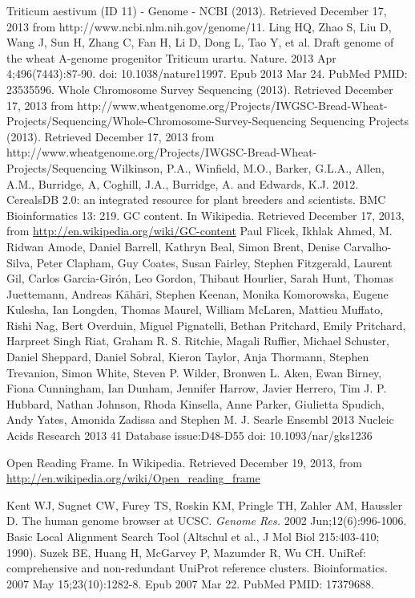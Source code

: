 \documentclass[10.9pt]{article} %
\begin{document}
%
%
\newpage
\begin{thebibliography}{99}
{\small
{}
Triticum aestivum (ID 11) - Genome - NCBI (2013). Retrieved December 17, 2013 from http://www.ncbi.nlm.nih.gov/genome/11.
Ling HQ, Zhao S, Liu D, Wang J, Sun H, Zhang C, Fan H, Li D, Dong L, Tao Y, et al. Draft genome of the wheat A-genome progenitor Triticum
urartu. Nature. 2013 Apr 4;496(7443):87-90. doi: 10.1038/nature11997. Epub 2013 Mar 24. PubMed PMID: 23535596. 
Whole Chromosome Survey Sequencing (2013). Retrieved December 17, 2013 from http://www.wheatgenome.org/Projects/IWGSC-Bread-Wheat-
Projects/Sequencing/Whole-Chromosome-Survey-Sequencing
Sequencing Projects (2013). Retrieved December 17, 2013 from http://www.wheatgenome.org/Projects/IWGSC-Bread-Wheat-Projects/Sequencing
Wilkinson, P.A., Winfield, M.O., Barker, G.L.A., Allen, A.M., Burridge, A, Coghill, J.A., Burridge, A. and Edwards, K.J. 2012. CerealsDB 2.0:
an integrated resource for plant breeders and scientists. BMC Bioinformatics 13: 219.
  GC content. In Wikipedia. Retrieved December 17, 2013, from
  \url{http://en.wikipedia.org/wiki/GC-content}
Paul Flicek, Ikhlak Ahmed, M. Ridwan Amode, Daniel Barrell, Kathryn Beal, Simon Brent, Denise Carvalho-Silva, Peter Clapham, Guy Coates, Susan Fairley, Stephen Fitzgerald, Laurent Gil, Carlos Garcia-Girón, Leo Gordon, Thibaut Hourlier, Sarah Hunt, Thomas Juettemann, Andreas Kähäri, Stephen Keenan, Monika Komorowska, Eugene Kulesha, Ian Longden, Thomas Maurel, William McLaren, Mattieu Muffato, Rishi Nag, Bert Overduin, Miguel Pignatelli, Bethan Pritchard, Emily Pritchard, Harpreet Singh Riat, Graham R. S. Ritchie, Magali Ruffier, Michael Schuster, Daniel Sheppard, Daniel Sobral, Kieron Taylor, Anja Thormann, Stephen Trevanion, Simon White, Steven P. Wilder, Bronwen L. Aken, Ewan Birney, Fiona Cunningham, Ian Dunham, Jennifer Harrow, Javier Herrero, Tim J. P. Hubbard, Nathan Johnson, Rhoda Kinsella, Anne Parker, Giulietta Spudich, Andy Yates, Amonida Zadissa and Stephen M. J. Searle
Ensembl 2013
Nucleic Acids Research 2013 41 Database issue:D48-D55
doi: 10.1093/nar/gks1236

  Open Reading Frame. In Wikipedia. Retrieved December 19, 2013, from
  \url{http://en.wikipedia.org/wiki/Open_reading_frame}

    Kent WJ, Sugnet CW, Furey TS, Roskin KM, Pringle TH, Zahler AM, Haussler D. The human genome browser at UCSC. 
    \emph{Genome Res.} 2002 Jun;12(6):996-1006. 
  Basic Local Alignment Search Tool (Altschul et al., J Mol Biol 215:403-410; 1990).
Suzek BE, Huang H, McGarvey P, Mazumder R, Wu CH. UniRef: comprehensive and non-redundant UniProt reference clusters. Bioinformatics. 2007 May 15;23(10):1282-8. Epub 2007 Mar 22. PubMed PMID: 17379688. 
}
\end{thebibliography}
\end{document}
